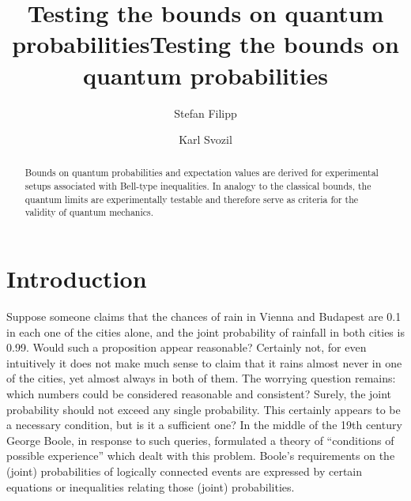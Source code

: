 \documentclass[pra,showpacs,showkeys,amsfonts]{revtex4}
\begin{document}
\title{\bf Testing the bounds on quantum probabilities}


\coverpage



\title{Testing the bounds on quantum probabilities}
\author{Stefan Filipp}
\author{Karl Svozil}


\begin{abstract}
Bounds on quantum probabilities and expectation values are derived for experimental setups
associated with Bell-type inequalities.
In analogy to the classical bounds, the quantum limits are experimentally testable
and therefore serve as criteria for the validity of quantum mechanics.
\end{abstract}


\maketitle

\section{Introduction}

Suppose someone claims
that the chances of rain in Vienna and Budapest are 0.1
in each one of the cities alone, and
the joint probability of rainfall in both cities is 0.99.
Would such a proposition appear reasonable?
Certainly not, for even intuitively it does not make much  sense to claim
that it rains almost never in one of the cities, yet almost always in both of them.
The worrying question remains:
which numbers could be considered reasonable and consistent?
Surely, the joint probability should not exceed any single probability.
This certainly appears to be a necessary condition, but is it a sufficient one?
In the middle of the 19th century George Boole,
in response to such queries, formulated a theory of
``conditions of possible experience'' \cite{Boole,Boole-62}
which dealt with this problem.
Boole's requirements on the (joint) probabilities of logically connected events
are expressed by certain equations or inequalities relating those (joint) probabilities.
\end{document}
